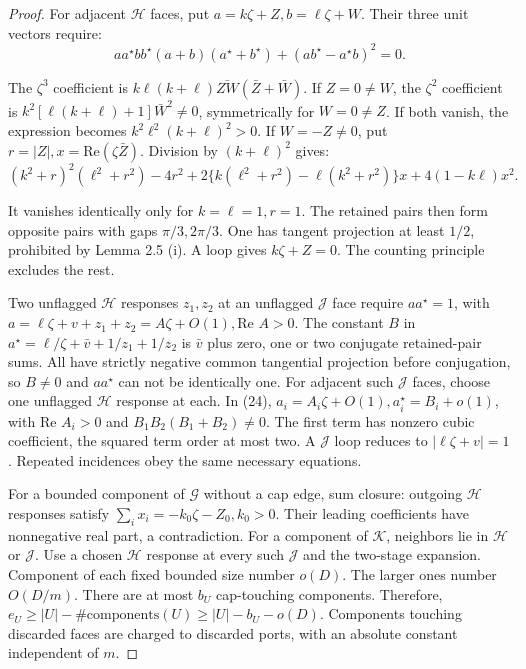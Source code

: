 \documentclass[10pt,reqno]{amsart}
\begin{document}
\begin{proof}
    For adjacent $\mathcal{H}$ faces, put $a = k \zeta + Z, b = \ell \zeta + W$. Their three unit vectors require:
    \begin{equation}
        aa^\star bb^\star (a + b) (a^\star + b^\star) + (ab^\star - a^\star b)^2 = 0.
    \end{equation}

    The $\zeta^3$ coefficient is $k \ell (k + \ell) \bar{ZW} (\bar{Z} + \bar{W})$. If $Z = 0 \ne W$, the $\zeta^2$ coefficient is $k^2 [\ell (k + \ell) + 1]\bar{W}^2 \ne 0$, symmetrically for $W = 0 \ne Z$. If both vanish, the expression becomes $k^2 \ell^2 (k + \ell)^2 > 0$. If $W = -Z \ne 0$, put $r = |Z|, x = \text{Re}(\zeta \bar{Z})$. Division by $(k + \ell)^2$ gives:
    \begin{equation}
        (k^2 + r)^2 (\ell^2 + r^2) - 4r^2 + 2 \{k (\ell^2 + r^2) - \ell (k^2 + r^2)\} x + 4 (1 - k \ell) x^2.
    \end{equation}


    It vanishes identically only for $k = \ell = 1, r = 1$. The retained pairs then form opposite pairs with gaps $\pi / 3, 2 \pi /3$. One has tangent projection at least $1 / 2$, prohibited by Lemma 2.5 (i). A loop gives $k \zeta + Z = 0$. The counting principle excludes the rest.

    Two unflagged $\mathcal{H}$ responses $z_1, z_2$ at an unflagged $\mathcal{J}$ face require $a a^\star = 1$, with $a = \ell \zeta + v + z_1 + z_2 = A \zeta + O(1), \text{Re }A > 0$. The constant $B$ in $a^\star = \ell / \zeta + \bar{v} + 1 / z_1 + 1 / z_2$ is $\bar{v}$ plus zero, one or two conjugate retained-pair sums. All have strictly negative common tangential projection before conjugation, so $B \ne 0$ and $a a^\star$ can not be identically one. For adjacent such $\mathcal{J}$ faces, choose one unflagged $\mathcal{H}$ response at each. In (24), $a_i = A_i \zeta + O(1), a_i^\star = B_i + o(1)$, with $\text{Re } A_i > 0$ and $B_1 B_2 (B_1 + B_2) \ne 0$. The first term has nonzero cubic coefficient, the squared term order at most two. A $\mathcal{J}$ loop reduces to $| \ell \zeta + v| = 1$. Repeated incidences obey the same necessary equations.

    For a bounded component of $\mathcal{G}$ without a cap edge, sum closure: outgoing $\mathcal{H}$ responses satisfy $\sum_i x_i = - k_0 \zeta - Z_0, k_0 > 0$. Their leading coefficients have nonnegative real part, a contradiction. For a component of $\mathcal{K}$, neighbors lie in $\mathcal{H}$ or $\mathcal{J}$. Use a chosen $\mathcal{H}$ response at every such $\mathcal{J}$ and the two-stage expansion. Component of each fixed bounded size number $o(D)$. The larger ones number $O(D / m)$. There are at most $b_U$ cap-touching components. Therefore, $e_U \ge |U| - \# \text{components}(U) \ge |U| - b_U - o(D)$. Components touching discarded faces are charged to discarded ports, with an absolute constant independent of $m$.


\end{proof}
\end{document}
